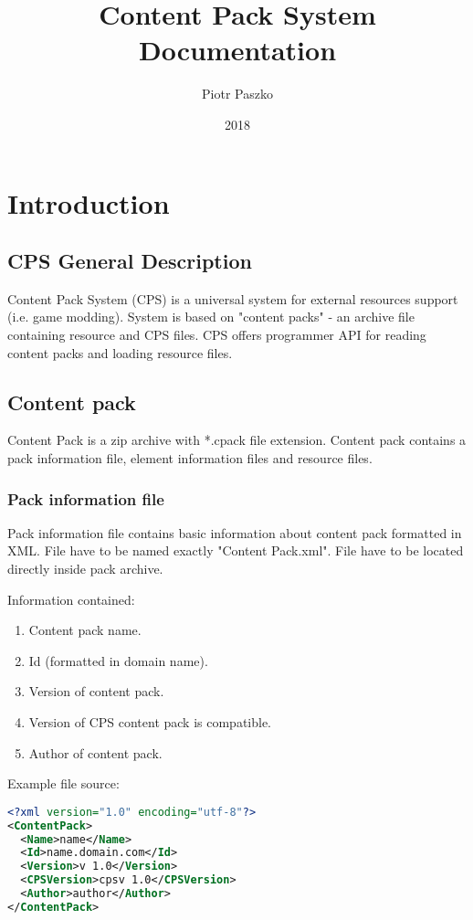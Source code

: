 \documentclass[a4paper]{report}
\title{Content Pack System Documentation}
\author{Piotr Paszko}
\date{2018}
\begin{document}
\maketitle

\tableofcontents

\chapter{Introduction}
\section{CPS General Description}
Content Pack System (CPS) is a universal system for external resources support (i.e. game modding). System is based on "content packs" - an archive file containing resource and CPS files. CPS offers programmer API for reading content packs and loading resource files.

\section{Content pack}
Content Pack is a zip archive with *.cpack file extension. Content pack contains a pack information file, element information files and resource files.

\subsection{Pack information file}
Pack information file contains basic information about content pack formatted in XML. File have to be named exactly "Content Pack.xml". File have to be located directly inside pack archive.

Information contained:
\begin{enumerate}
\item Content pack name.
\item Id (formatted in domain name).
\item Version of content pack.
\item Version of CPS content pack is compatible.
\item Author of content pack.
\end{enumerate}

Example file source:
\begin{lstlisting}[language=XML]
<?xml version="1.0" encoding="utf-8"?>
<ContentPack>
  <Name>name</Name>
  <Id>name.domain.com</Id>
  <Version>v 1.0</Version>
  <CPSVersion>cpsv 1.0</CPSVersion>
  <Author>author</Author>
</ContentPack>
\end{lstlisting}
\end{document}
